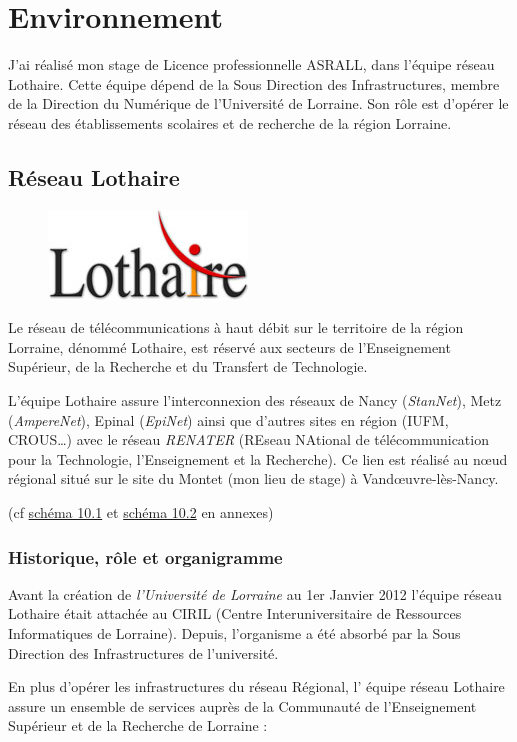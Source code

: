 \documentclass[a4paper,12pt,one side,titlepage]{report}
\begin{document}
\chapter{Environnement}
J'ai réalisé mon stage de Licence professionnelle ASRALL, dans l'équipe réseau Lothaire.
Cette équipe dépend de la Sous Direction des Infrastructures, membre de la Direction 
du Numérique de l'Université de Lorraine. Son rôle est d'opérer le réseau des 
établissements scolaires et de recherche de la région Lorraine.
\section{Réseau Lothaire}
\begin{figure}[H]
\center
\includegraphics{lothaire.jpg}
\end{figure}
Le réseau de télécommunications à haut débit sur le territoire de la région Lorraine, 
dénommé Lothaire, est réservé aux secteurs de l’Enseignement Supérieur, de la Recherche 
et du Transfert de Technologie. 

L'équipe Lothaire assure l’interconnexion des réseaux de Nancy (\emph{StanNet}), 
Metz (\emph{AmpereNet}), Epinal (\emph{EpiNet}) ainsi que d'autres sites en région 
(IUFM, CROUS\ldots) avec le réseau \emph{RENATER} (REseau NAtional de télécommunication 
pour la Technologie, l'Enseignement et la Recherche). Ce lien est réalisé au nœud 
régional situé sur le site du Montet (mon lieu de stage) à Vandœuvre-lès-Nancy.

(cf \hyperref[fig:imagereseaulothaire1]{schéma 10.1}  et \hyperref[fig:imagereseaulothaire1]{schéma 10.2} 
en annexes)

\subsection{Historique, rôle et organigramme}

Avant la création de \emph{l'Université de Lorraine} au 1er Janvier 2012 l'équipe 
réseau Lothaire était attachée au CIRIL (Centre Interuniversitaire de Ressources Informatiques
de Lorraine). Depuis, l'organisme a été absorbé par la Sous Direction des Infrastructures
de l'université.

En plus d’opérer les infrastructures du réseau Régional, l’ équipe réseau Lothaire 
assure un ensemble de services auprès de la Communauté de l’Enseignement Supérieur 
et de la Recherche de Lorraine :
\end{document}
